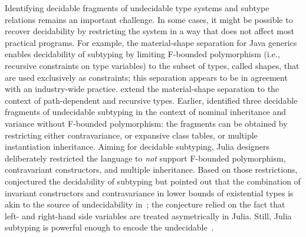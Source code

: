 Identifying decidable fragments of undecidable type systems and subtype
relations remains an important challenge.
In some cases, it might be possible to recover
decidability by restricting the system in a way that does not affect most
practical programs. For example, the material-shape separation for Java
generics~\cite{bib:greenman:f-bound-material-shape:2014}
enables decidability of subtyping by limiting F-bounded polymorphism %
(i.e., recursive constraints on type variables)
to the subset of types, called shapes, that are used exclusively as constraints;
this separation appears to be in agreement with an industry-wide practice.
\citet{bib:mackay:path-dep-dec:2020} extend the material-shape separation
to the context of path-dependent and recursive types. %
Earlier, \citet{bib:kennedy:nom-sub-var-dec:2007} identified three decidable
fragments of undecidable subtyping in the context of nominal inheritance
and variance without F-bounded polymorphism: the fragments can be obtained by
restricting either contravariance, or expansive class tables,
or multiple instantiation inheritance.
Aiming for decidable subtyping, Julia designers deliberately restricted
the language to \emph{not} support F-bounded polymorphism, 
contravariant constructors, and multiple inheritance.
Based on those restrictions, \citet{bib:bezanson:julia:2015} conjectured
the decidability of subtyping but pointed out that
the combination of invariant constructors
and contravariance in lower bounds of existential types
is akin to the source of undecidability in~\FSub;
the conjecture relied on the fact that left- and right-hand side variables
are treated asymetrically in Julia.
Still, Julia subtyping is powerful enough to encode
the undecidable~\FSub.

